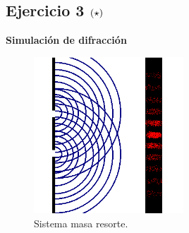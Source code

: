 \subsection*{Ejercicio 3 \large{$\left( \star \right)$}}

\textbf{Simulación de difracción}

\begin{figure}[htbp]
	\centering
	\includegraphics[width=0.50\textwidth]
	{./pictures/diffraction.png}

	\caption{\small{Sistema masa resorte.}}
	
	\label{fig:mass_spring}
\end{figure}

